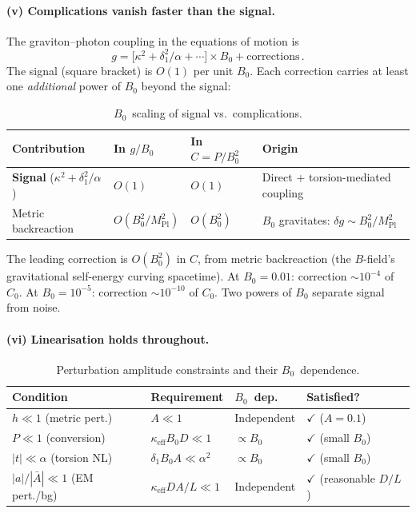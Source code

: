 \paragraph{(v) Complications vanish faster than the signal.}
The graviton--photon coupling in the equations of motion is
\begin{equation}
  g = \bigl[\kappa^2 + \delta_1^2/\alpha + \cdots\bigr] \times B_0
    + \text{corrections}\,.
  \label{eq:bv-coupling}
\end{equation}
The signal (square bracket) is $O(1)$ per unit $B_0$.  Each correction
carries at least one \emph{additional} power of $B_0$ beyond the signal:

\begin{table}[htbp]
\centering
\caption{$B_0$~scaling of signal vs.\ complications.}
\label{tab:bv-scaling}
\begin{tabular}{@{}llll@{}}
\toprule
Contribution & In $g/B_0$ & In $C = P/B_0^2$ & Origin \\
\midrule
\textbf{Signal} ($\kappa^2 + \delta_1^2/\alpha$)
  & $O(1)$ & $O(1)$ & Direct + torsion-mediated coupling \\
Metric backreaction
  & $O(B_0^2/M_\mathrm{Pl}^2)$ & $O(B_0^2)$ & $B_0$ gravitates: $\delta g \sim B_0^2/M_\mathrm{Pl}^2$ \\
\bottomrule
\end{tabular}
\end{table}

The leading correction is $O(B_0^2)$ in $C$, from metric backreaction
(the $B$-field's gravitational self-energy curving spacetime).
At $B_0 = 0.01$: correction $\sim 10^{-4}$ of $C_0$.
At $B_0 = 10^{-5}$: correction $\sim 10^{-10}$ of $C_0$.
Two powers of $B_0$ separate signal from noise.

\paragraph{(vi) Linearisation holds throughout.}
\begin{table}[htbp]
\centering
\caption{Perturbation amplitude constraints and their $B_0$~dependence.}
\label{tab:bv-linearisation}
\begin{tabular}{@{}llll@{}}
\toprule
Condition & Requirement & $B_0$~dep. & Satisfied? \\
\midrule
$h \ll 1$ (metric pert.) & $A \ll 1$ & Independent & $\checkmark$ ($A = 0.1$) \\
$P \ll 1$ (conversion) & $\kappa_\mathrm{eff} B_0 D \ll 1$ & $\propto B_0$ & $\checkmark$ (small $B_0$) \\
$|t| \ll \alpha$ (torsion NL) & $\delta_1 B_0 A \ll \alpha^2$ & $\propto B_0$ & $\checkmark$ (small $B_0$) \\
$|a|/|\bar{A}| \ll 1$ (EM pert./bg) & $\kappa_\mathrm{eff} D A / L \ll 1$ & Independent & $\checkmark$ (reasonable $D/L$) \\
\bottomrule
\end{tabular}
\end{table}

